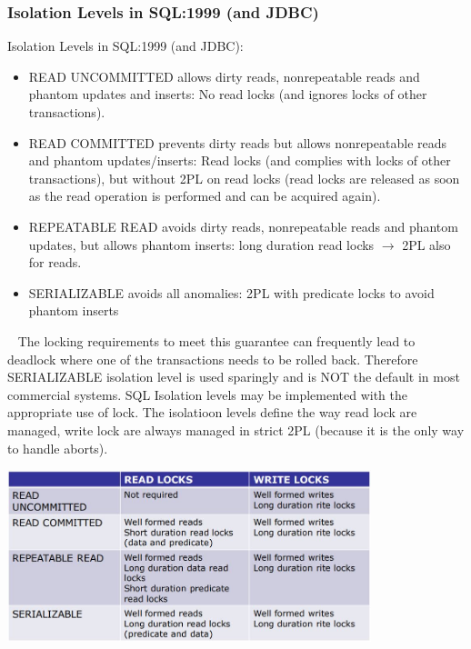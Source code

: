 \subsubsection{Isolation Levels in SQL:1999 (and JDBC)}
Isolation Levels in SQL:1999 (and JDBC):
\begin{itemize}
    \item READ UNCOMMITTED allows dirty reads, nonrepeatable reads and
    phantom updates and inserts: No read locks (and ignores locks of other transactions).
    \item READ COMMITTED prevents dirty reads but allows nonrepeatable
    reads and phantom updates/inserts: Read locks (and complies with locks of other transactions), but
    without 2PL on read locks (read locks are released as soon as
    the read operation is performed and can be acquired again).
    \item REPEATABLE READ avoids dirty reads, nonrepeatable reads and
    phantom updates, but allows phantom inserts: long duration read locks $\rightarrow$ 2PL also for reads.
    \item SERIALIZABLE avoids all anomalies: 2PL with predicate locks to avoid phantom inserts
\end{itemize}
\ \newline
The locking requirements to meet this guarantee can
frequently lead to deadlock where one of the transactions
needs to be rolled back. Therefore SERIALIZABLE isolation level is used sparingly and
is NOT the default in most commercial systems.
\newline
\newline
SQL Isolation levels may be implemented with the appropriate
use of lock.\newline
The isolatioon levels define the way read lock are managed, write lock are always managed in strict 2PL (because it is the only way to handle aborts).
\begin{center}
    \includegraphics[height=5cm]{../arguments/isolationlevels.JPG}
\end{center}

